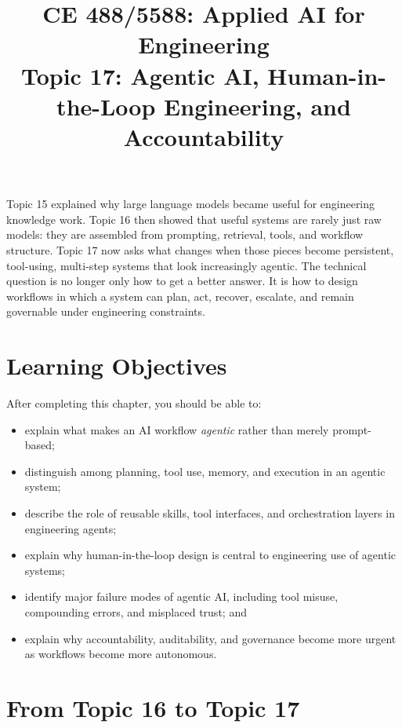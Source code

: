\documentclass[12pt]{article}
\begin{document}
\doublespacing

\title{CE 488/5588: Applied AI for Engineering\\ \large Topic 17: Agentic AI, Human-in-the-Loop Engineering, and Accountability}
\author{}
\date{}
\maketitle

\begin{ch-box}
Topic 15 explained why large language models became useful for engineering knowledge work. Topic 16 then showed that useful systems are rarely just raw models: they are assembled from prompting, retrieval, tools, and workflow structure. Topic 17 now asks what changes when those pieces become persistent, tool-using, multi-step systems that look increasingly agentic. The technical question is no longer only how to get a better answer. It is how to design workflows in which a system can plan, act, recover, escalate, and remain governable under engineering constraints.
\end{ch-box}

\section*{Learning Objectives}
After completing this chapter, you should be able to:
\begin{itemize}
    \item explain what makes an AI workflow \emph{agentic} rather than merely prompt-based;
    \item distinguish among planning, tool use, memory, and execution in an agentic system;
    \item describe the role of reusable skills, tool interfaces, and orchestration layers in engineering agents;
    \item explain why human-in-the-loop design is central to engineering use of agentic systems;
    \item identify major failure modes of agentic AI, including tool misuse, compounding errors, and misplaced trust; and
    \item explain why accountability, auditability, and governance become more urgent as workflows become more autonomous.
\end{itemize}

\section{From Topic 16 to Topic 17}
\end{document}
